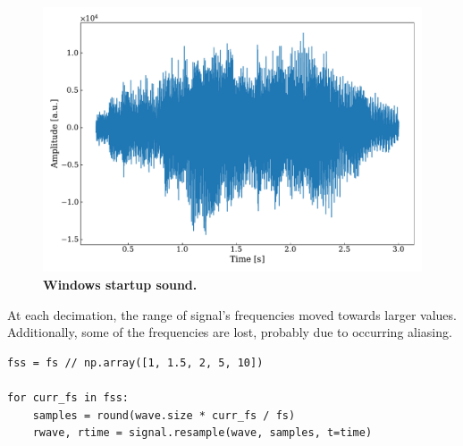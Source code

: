 \documentclass[13pt,a4paper]{article}
\begin{document}
\begin{figure}[ht!]
    \centering
    \includegraphics[width=\linewidth]{wave.pdf}
    \caption{\textbf{Windows startup sound.}}
    \label{fig:wave}
\end{figure}

At each decimation, the range of signal's frequencies moved towards larger values. Additionally, some of the frequencies are lost, probably due to occurring aliasing.

\begin{lstlisting}[caption={\textbf{Code snippet for gradual decimation of the signal.}}]
fss = fs // np.array([1, 1.5, 2, 5, 10])

for curr_fs in fss:
    samples = round(wave.size * curr_fs / fs)
    rwave, rtime = signal.resample(wave, samples, t=time)
\end{lstlisting}
\end{document}
